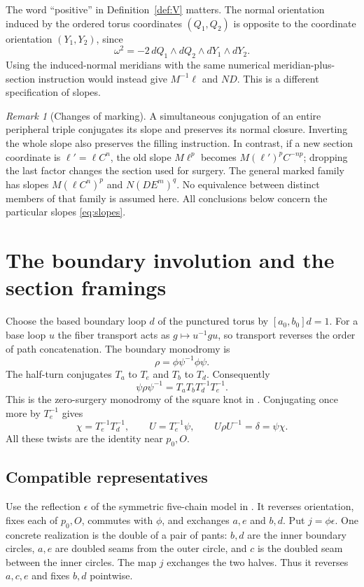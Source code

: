 \documentclass[11pt]{amsart}
\theoremstyle{definition}
\theoremstyle{remark}
\newtheorem{remark}[theorem]{Remark}
\begin{document}
The word ``positive'' in Definition~\ref{def:V} matters. The normal
orientation induced by the ordered torus coordinates $(Q_1,Q_2)$ is
opposite to the coordinate orientation $(Y_1,Y_2)$, since
\[
 \omega^2=-2\,dQ_1\wedge dQ_2\wedge dY_1\wedge dY_2.
\]
Using the induced-normal meridians with the same numerical
meridian-plus-section instruction would instead give $M^{-1}\ell$
and $ND$. This is a different specification of slopes.

\begin{remark}[Changes of marking]\label{rem:conventions}
A simultaneous conjugation of an entire peripheral triple conjugates
its slope and preserves its normal closure. Inverting the whole slope
also preserves the filling instruction. In contrast, if a new section
coordinate is $\ell'=\ell C^n$, the old slope $M\ell^p$ becomes
$M(\ell')^pC^{-np}$; dropping the last factor changes the section
used for surgery. The general marked family has slopes
$M(\ell C^n)^p$ and $N(DE^m)^q$. No equivalence between distinct
members of that family is assumed here. All conclusions below concern
the particular slopes \eqref{eq:slopes}.
\end{remark}

\section{The boundary involution and the section framings}\label{sec:boundary}

Choose the based boundary loop $d$ of the punctured torus by
$[a_0,b_0]d=1$. For a base loop $u$ the fiber transport acts as
$g\mapsto u^{-1}gu$, so transport reverses the order of path
concatenation. The boundary monodromy is
\begin{equation}\label{eq:rho}
                  \rho=\phi\psi^{-1}\phi\psi.
\end{equation}
The half-turn conjugates $T_a$ to $T_e$ and $T_b$ to $T_d$.
Consequently
\[
       \psi\rho\psi^{-1}=T_aT_bT_d^{-1}T_e^{-1}.
\]
This is the zero-surgery monodromy of the square knot in
\cite[Section 1]{LP25}. Conjugating once more by $T_e^{-1}$ gives
\begin{equation}\label{eq:boundary-marking}
 \chi=T_e^{-1}T_d^{-1},\qquad
 U=T_e^{-1}\psi,\qquad U\rho U^{-1}=\delta=\psi\chi.
\end{equation}
All these twists are the identity near $p_0,O$.

\subsection{Compatible representatives}
Use the reflection $\epsilon$ of the symmetric five-chain model in
\cite[Figure 2]{LP25}. It reverses orientation, fixes each of $p_0,O$,
commutes with $\phi$, and exchanges $a,e$ and $b,d$.
Put $j=\phi\epsilon$. One concrete realization is the double of a
pair of pants: $b,d$ are the inner boundary circles, $a,e$ are
doubled seams from the outer circle, and $c$ is the doubled seam
between the inner circles. The map $j$ exchanges the two halves.
Thus it reverses $a,c,e$ and fixes $b,d$ pointwise.
\end{document}
